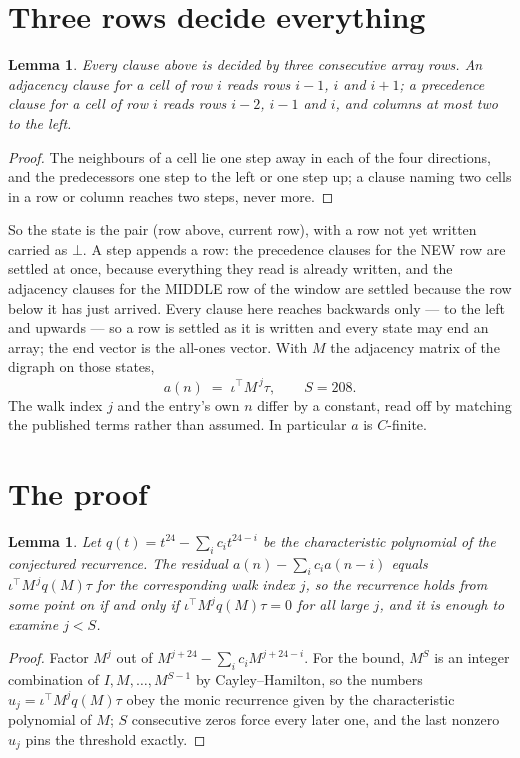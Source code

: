 \documentclass[11pt,a4paper]{article}
\theoremstyle{plain}
\newtheorem{lemma}[theorem]{Lemma}
\theoremstyle{definition}
\begin{document}
\section{Three rows decide everything}

\begin{lemma}\label{lem:win}
Every clause above is decided by three consecutive array rows. An adjacency clause for a cell
of row $i$ reads rows $i-1$, $i$ and $i+1$; a precedence clause for a cell of row $i$ reads
rows $i-2$, $i-1$ and $i$, and columns at most two to the left.
\end{lemma}

\begin{proof}
The neighbours of a cell lie one step away in each of the four directions, and the predecessors
one step to the left or one step up; a clause naming two cells in a row or column reaches two
steps, never more.
\end{proof}

So the state is the pair (row above, current row), with a row not yet written carried as
$\bot$. A step appends a row: the precedence clauses for the NEW row are settled at once,
because everything they read is already written, and the adjacency clauses for the MIDDLE row
of the window are settled because the row below it has just arrived. Every clause here reaches backwards only --- to the left and upwards --- so a
row is settled as it is written and every state may end an array; the end vector is the
all-ones vector. With $M$ the
adjacency matrix of the digraph on those states,
\[
a(n)\;=\;\iota^{\!\top}M^{\,j}\tau ,\qquad S=208.
\]
The walk index $j$ and the entry's own $n$ differ by a constant, read off by matching the
published terms rather than assumed. In particular $a$ is $C$-finite.

\section{The proof}

\begin{lemma}\label{lem:crit}
Let $q(t)=t^{24}-\sum_i c_it^{24-i}$ be the characteristic polynomial of the
conjectured recurrence. The residual $a(n)-\sum_ic_ia(n-i)$ equals
$\iota^{\!\top}M^{\,j}q(M)\tau$ for the corresponding walk index $j$, so the recurrence
holds from some point on if and only if $\iota^{\!\top}M^{j}q(M)\tau=0$ for all large $j$,
and it is enough to examine $j<S$.
\end{lemma}

\begin{proof}
Factor $M^{j}$ out of $M^{j+24}-\sum_ic_iM^{j+24-i}$. For the bound, $M^{S}$
is an integer combination of $I,M,\dots,M^{S-1}$ by Cayley--Hamilton, so the numbers
$u_j=\iota^{\!\top}M^{j}q(M)\tau$ obey the monic recurrence given by the characteristic
polynomial of $M$; $S$ consecutive zeros force every later one, and the last nonzero $u_j$
pins the threshold exactly.
\end{proof}
\end{document}
